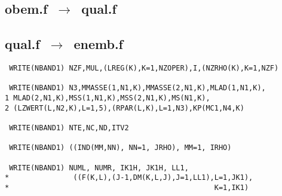 \documentclass[onecolumn,preprint,superscriptaddress,nofootinbib,notitlepage,10pt,linenumbers]{revtex4-1}
\begin{document}
\subsection*{obem.f~$\to$~qual.f}


\subsection*{qual.f~$\to$~enemb.f}

\begin{lstlisting}
 WRITE(NBAND1) NZF,MUL,(LREG(K),K=1,NZOPER),I,(NZRHO(K),K=1,NZF)

 WRITE(NBAND1) N3,MMASSE(1,N1,K),MMASSE(2,N1,K),MLAD(1,N1,K),
1 MLAD(2,N1,K),MSS(1,N1,K),MSS(2,N1,K),MS(N1,K),
2 (LZWERT(L,N2,K),L=1,5),(RPAR(L,K),L=1,N3),KP(MC1,N4,K)

 WRITE(NBAND1) NTE,NC,ND,ITV2

 WRITE(NBAND1) ((IND(MM,NN), NN=1, JRHO), MM=1, IRHO)

 WRITE(NBAND1) NUML, NUMR, IK1H, JK1H, LL1,
*               ((F(K,L),(J-1,DM(K,L,J),J=1,LL1),L=1,JK1),
*                                                K=1,IK1)
\end{lstlisting}



\end{document}
